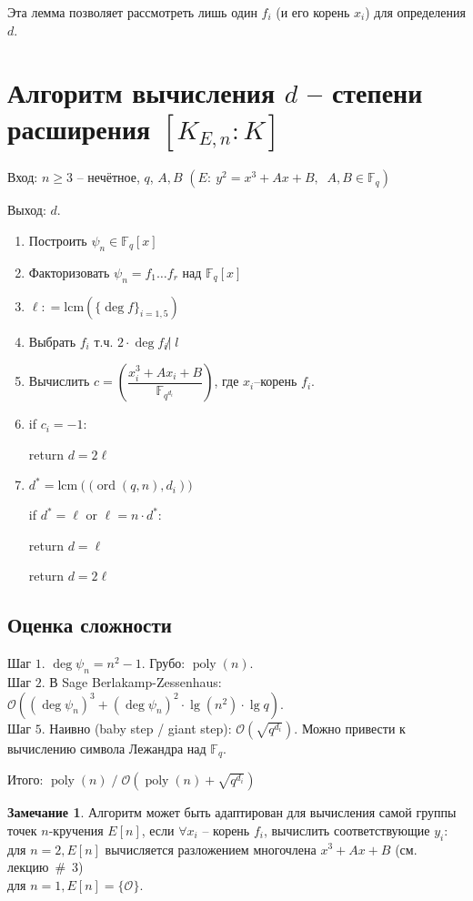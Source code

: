 \documentclass[12pt]{article}
\newcommand{\F}{{{\mathbb F}}}
\newcommand{\bigO}{\mathcal{O}}
\theoremstyle{definition}
\theoremstyle{definition}
\theoremstyle{definition}
\newtheorem{remark}[theorem]{Замечание}
\begin{document}
Эта лемма позволяет рассмотреть лишь один $f_i$ (и его корень $x_i$) для определения $d$. 

\section*{Алгоритм вычисления $d$ -- степени расширения $[{K_{E,n}}:K]$}

Вход: $n \geqslant 3$ -- нечётное, $q$, $A, B$ $( E:\:{y^2} = {x^3} + Ax + B,\;\;A,B \in \F_q )$

Выход: $d$. 

\begin{enumerate}
	\item Построить ${\psi _n} \in {\F_q}[x]$
	
	\item Факторизовать ${\psi _n} = {f_1} \ldots {f_r}$ над ${\F_q}[x]$
	
	\item $\ell: = \mathrm{lcm}( {{{\{ {\deg f}\}}_{i = 1,5}}} )$
	
	\item Выбрать ${f_i}$ т.ч. $2 \cdot \deg {f_i} \not | \; l$
	
	\item Вычислить $c = \left(\dfrac{x_i^3 + A{x_i} + B}{\F_{q^{d_i}}}\right)$, где $x_i$--корень $f_i$.
	
	\item if $c_i = - 1$:
	
	\quad return $d = 2\ell$
	
	\item ${d^*} = \mathrm{lcm}(\mathrm( {\operatorname{ord} ( {q,n}),{d_i}}) )$
	
	if ${d^*} = \ell$ or $\ell = n \cdot {d^*}$:
	
	\quad return $d = \ell$
	
	return $d = 2\ell$ 
\end{enumerate}

\subsection*{Оценка сложности} 
Шаг $1$. $\deg \psi_n = n^2 - 1$. Грубо: $\operatorname{poly}(n)$. \\
Шаг $2$. В Sage Berlakamp-Zessenhaus: $\bigO( (\deg \psi_n)^3 + (\deg \psi_n)^2 \cdot \operatorname{lg}(n^2) \cdot \operatorname{lg}q  )$.\\
Шаг $5$. Наивно (baby step / giant step): $\bigO(\sqrt{q^{d_i}})$. Можно привести к вычислению символа Лежандра над $\F_q$.

Итого: $\operatorname{poly}(n) \;/\; \bigO(\operatorname{poly}(n) + \sqrt{q^{d_i}})$

\begin{remark}
	Алгоритм может быть адаптирован для вычисления самой группы точек $n$-кручения $E[ n]$, если $\forall {x_i}$ -- корень ${f_i}$, вычислить соответствующие ${y_i}$:\\
	для $n = 2, E[n]$ вычисляется разложением многочлена ${x^3} + Ax + B$ (см. лекцию~\#~3) \\
	для $n = 1, E[n] = \{ \bigO \}$. 
\end{remark}
\end{document}
